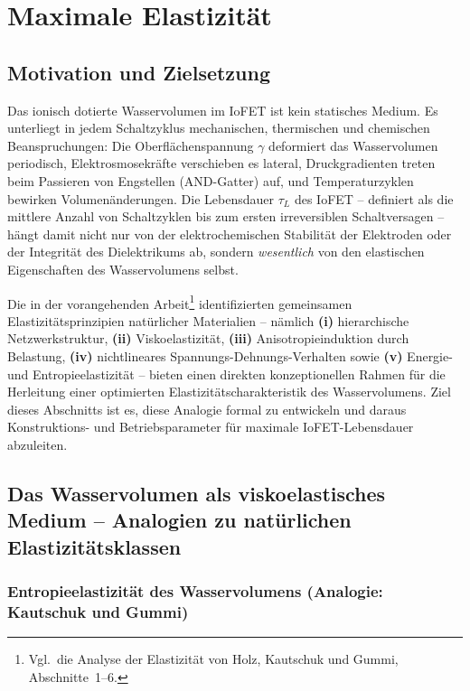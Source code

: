 ﻿\documentclass[a4paper,12pt]{scrreprt}
\theoremstyle{definition}
\begin{document}
\section{Maximale Elastizität}
\label{sec:elastizitaet_lebensdauer}

\subsection{Motivation und Zielsetzung}

Das ionisch dotierte Wasservolumen im IoFET ist kein statisches Medium.
Es unterliegt in jedem Schaltzyklus mechanischen, thermischen und
chemischen Beanspruchungen: Die Oberflächenspannung $\gamma$ deformiert
das Wasservolumen periodisch, Elektrosmosekräfte verschieben es lateral,
Druckgradienten treten beim Passieren von Engstellen (AND-Gatter) auf,
und Temperaturzyklen bewirken Volumenänderungen. Die Lebensdauer $\tau_L$
des IoFET -- definiert als die mittlere Anzahl von Schaltzyklen bis zum
ersten irreversiblen Schaltversagen -- hängt damit nicht nur von der
elektrochemischen Stabilität der Elektroden oder der Integrität des
Dielektrikums ab, sondern \emph{wesentlich} von den elastischen
Eigenschaften des Wasservolumens selbst.

Die in der vorangehenden Arbeit\footnote{Vgl.\ die Analyse der Elastizität
	von Holz, Kautschuk und Gummi, Abschnitte~1--6.} identifizierten
gemeinsamen Elastizitätsprinzipien natürlicher Materialien -- nämlich
\textbf{(i)} hierarchische Netzwerkstruktur, \textbf{(ii)} Viskoelastizität,
\textbf{(iii)} Anisotropieinduktion durch Belastung, \textbf{(iv)} nichtlineares
Spannungs-Dehnungs-Verhalten sowie \textbf{(v)} Energie- und Entropieelastizität --
bieten einen direkten konzeptionellen Rahmen für die Herleitung einer
optimierten Elastizitätscharakteristik des Wasservolumens. Ziel dieses
Abschnitts ist es, diese Analogie formal zu entwickeln und daraus
Konstruktions- und Betriebsparameter für maximale IoFET-Lebensdauer
abzuleiten.

\subsection{Das Wasservolumen als viskoelastisches Medium -- Analogien zu
	natürlichen Elastizitätsklassen}

\subsubsection{Entropieelastizität des Wasservolumens (Analogie: Kautschuk und Gummi)}
\end{document}
